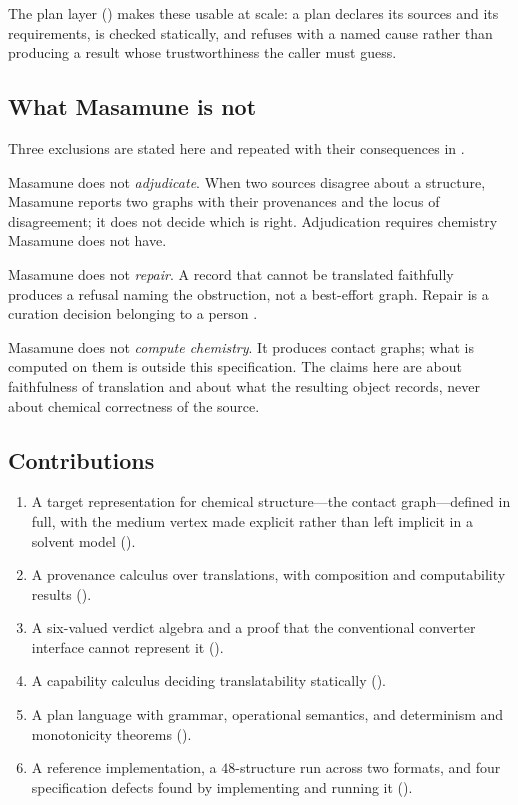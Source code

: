 \documentclass[11pt,twocolumn,a4paper]{article}
\theoremstyle{msthm}
\theoremstyle{definition}
\theoremstyle{remark}
\begin{document}
The plan layer () makes these usable at scale: a plan
declares its sources and its requirements, is checked statically, and
refuses with a named cause rather than producing a result whose
trustworthiness the caller must guess.

\subsection{What Masamune is not}

Three exclusions are stated here and repeated with their consequences in
.

Masamune does not \emph{adjudicate}. When two sources disagree about a
structure, Masamune reports two graphs with their provenances and the
locus of disagreement; it does not decide which is right. Adjudication
requires chemistry Masamune does not have.

Masamune does not \emph{repair}. A record that cannot be translated
faithfully produces a refusal naming the obstruction, not a best-effort
graph. Repair is a curation decision belonging to a person
\citep{fourches2016curation2}.

Masamune does not \emph{compute chemistry}. It produces contact graphs;
what is computed on them is outside this specification. The claims here
are about faithfulness of translation and about what the resulting
object records, never about chemical correctness of the source.

\subsection{Contributions}

\begin{enumerate}[label=(\roman*),leftmargin=2.2em,itemsep=2pt]
\item A target representation for chemical structure---the contact
graph---defined in full, with the medium vertex made explicit rather
than left implicit in a solvent model ().
\item A provenance calculus over translations, with composition and
computability results ().
\item A six-valued verdict algebra and a proof that the conventional
converter interface cannot represent it ().
\item A capability calculus deciding translatability statically
().
\item A plan language with grammar, operational semantics, and
determinism and monotonicity theorems ().
\item A reference implementation, a $48$-structure run across two
formats, and four specification defects found by implementing and
running it ().
\end{enumerate}
\end{document}
